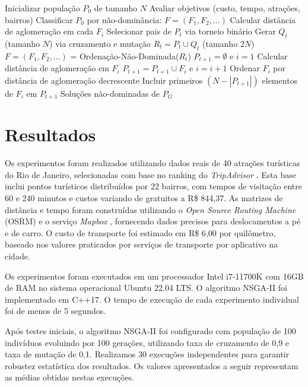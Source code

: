 \documentclass{pssbmac}
\begin{document}
\begin{algorithm}[ht!]
\footnotesize 
\caption{Algoritmo NSGA-II adaptado para roteirização turística}
\label{alg:nsga2}
\begin{algorithmic}[1]
\STATE Inicializar população $P_0$ de tamanho $N$
\STATE Avaliar objetivos (custo, tempo, atrações, bairros)
\STATE Classificar $P_0$ por não-dominância: $F = (F_1, F_2, ...)$
\STATE Calcular distância de aglomeração em cada $F_i$
  \STATE Selecionar pais de $P_t$ via torneio binário
  \STATE Gerar $Q_t$ (tamanho $N$) via cruzamento e mutação
  \STATE $R_t = P_t \cup Q_t$ (tamanho $2N$)
  \STATE $F = (F_1, F_2, ...)$ = Ordenação-Não-Dominada($R_t$)
  \STATE $P_{t+1} = \emptyset$ e $i = 1$
    \STATE Calcular distância de aglomeração em $F_i$
    \STATE $P_{t+1} = P_{t+1} \cup F_i$ e $i = i + 1$
  \ENDWHILE
  \STATE Ordenar $F_i$ por distância de aglomeração decrescente
  \STATE Incluir primeiros $(N-|P_{t+1}|)$ elementos de $F_i$ em $P_{t+1}$
\ENDFOR
\RETURN Soluções não-dominadas de $P_G$
\end{algorithmic}
\end{algorithm}

\section{Resultados}

Os experimentos foram realizados utilizando dados reais de 40 atrações turísticas do Rio de Janeiro, selecionadas com base no ranking do \textit{TripAdvisor} \cite{TripAdvisor2024}. Esta base inclui pontos turísticos distribuídos por 22 bairros, com tempos de visitação entre 60 e 240 minutos e custos variando de gratuitos a R\$ 844,37. As matrizes de distância e tempo foram construídas utilizando o \textit{Open Source Routing Machine} (OSRM) \cite{OpenStreetMap2024} e o serviço \textit{Mapbox} \cite{Mapbox2024}, fornecendo dados precisos para deslocamentos a pé e de carro. O custo de transporte foi estimado em R\$ 6,00 por quilômetro, baseado nos valores praticados por serviços de transporte por aplicativo na cidade.

Os experimentos foram executados em um processador Intel i7-11700K com 16GB de RAM no sistema operacional Ubuntu 22.04 LTS. O algoritmo NSGA-II foi implementado em C++17. O tempo de execução de cada experimento individual foi de menos de 5 segundos. 

Após testes iniciais, o algoritmo NSGA-II foi configurado com população de 100 indivíduos evoluindo por 100 gerações, utilizando taxa de cruzamento de 0,9 e taxa de mutação de 0,1. Realizamos 30 execuções independentes para garantir robustez estatística dos resultados. Os valores apresentados a seguir representam as médias obtidas nestas execuções.
\end{document}
